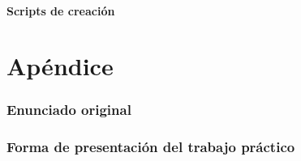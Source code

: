 \documentclass[a4paper,11pt]{article}
\begin{document}
\FloatBarrier

\subsection{\textbf{Scripts de creación}}




\clearpage

\part{Apéndice}
\appendix

\section{Enunciado original}\label{sec:enunciado}


\clearpage

\section{\textbf{Forma de presentación del trabajo práctico}}
\end{document}
